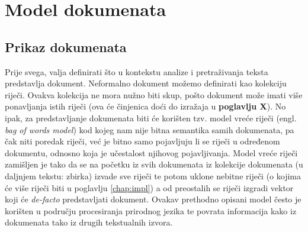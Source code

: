 \documentclass[times, utf8, zavrsni]{fer}
\begin{document}
\chapter{Model dokumenata}
\label{docmodel}

\section{Prikaz dokumenata}
Prije svega, valja definirati što u kontekstu analize i pretraživanja teksta predstavlja dokument. Neformalno dokument možemo definirati kao kolekciju riječi. Ovakva kolekcija ne mora nužno biti skup, pošto dokument može imati više ponavljanja istih riječi (ova će činjenica doći do izražaja u \textbf{poglavlju X}). No ipak, za predstavljanje dokumenata biti će korišten tzv. model vreće riječi (engl. \textit{bag of words model}) kod kojeg nam nije bitna semantika samih dokumenata, pa čak niti poredak riječi, već je bitno samo pojavljuju li se riječi u određenom dokumentu, odnosno koja je učestalost njihovog pojavljivanja.
Model vreće riječi zamišljen je tako da se na početku iz svih dokumenata iz kolekcije dokumenata (u daljnjem tekstu: zbirka) izvade sve riječi te potom uklone nebitne riječi (o kojima će više riječi biti u poglavlju \ref{chap:impl}) a od preostalih se riječi izgradi vektor koji će \textit{de-facto} predstavljati dokument. Ovakav prethodno opisani model često je korišten u području procesiranja prirodnog jezika te povrata informacija kako iz dokumenata tako iz drugih tekstualnih izvora.
\end{document}

